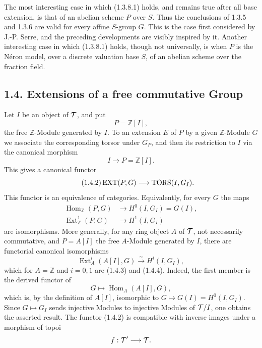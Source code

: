 \documentclass[11pt]{article}
\providecommand{\Z}{\mathbb Z}
\providecommand{\Hom}{\operatorname{Hom}}
\begin{document}
The most interesting case in which (1.3.8.1) holds, and remains true after all base extension, is that of an abelian scheme \(P\) over \(S\).  Thus the conclusions of 1.3.5 and 1.3.6 are valid for every affine \(S\)-group \(G\).  This is the case first considered by J.-P. Serre, and the preceding developments are visibly inspired by it.  Another interesting case in which (1.3.8.1) holds, though not universally, is when \(P\) is the Néron model, over a discrete valuation base \(S\), of an abelian scheme over the fraction field.

\subsection*{1.4. Extensions of a free commutative Group}

Let \(I\) be an object of \(\mathcal T\), and put
\begin{equation}\tag{1.4.1}
  P=\Z[I],
\end{equation}
the free \(\Z\)-Module generated by \(I\).  To an extension \(E\) of \(P\) by a given \(\Z\)-Module \(G\) we associate the corresponding torsor under \(G_P\), and then its restriction to \(I\) via the canonical morphism
\[
  I\longrightarrow P=\Z[I].
\]
This gives a canonical functor
\begin{equation}\tag{1.4.2}
  \operatorname{EXT}(P,G)\longrightarrow \operatorname{TORS}(I,G_I).
\end{equation}
This functor is an equivalence of categories.  Equivalently, for every \(G\) the maps
\begin{align}
  \Hom_{\Z}(P,G)&\longrightarrow H^0(I,G_I)=G(I), \tag{1.4.3}\\
  \operatorname{Ext}^{1}_{\Z}(P,G)&\longrightarrow H^1(I,G_I) \tag{1.4.4}
\end{align}
are isomorphisms.  More generally, for any ring object \(A\) of \(\mathcal T\), not necessarily commutative, and \(P=A[I]\) the free \(A\)-Module generated by \(I\), there are functorial canonical isomorphisms
\begin{equation}\tag{1.4.5}
  \operatorname{Ext}^{i}_{A}(A[I],G)\xrightarrow{\sim}H^i(I,G_I),
\end{equation}
which for \(A=\Z\) and \(i=0,1\) are (1.4.3) and (1.4.4).  Indeed, the first member is the derived functor of
\[
  G\longmapsto\operatorname{Hom}_A(A[I],G),
\]
which is, by the definition of \(A[I]\), isomorphic to \(G\mapsto G(I)=H^0(I,G_I)\).  Since \(G\mapsto G_I\) sends injective Modules to injective Modules of \(\mathcal T/I\), one obtains the asserted result.  The functor (1.4.2) is compatible with inverse images under a morphism of topoi
\[
  f:\mathcal T'\longrightarrow\mathcal T.
\]
\end{document}
